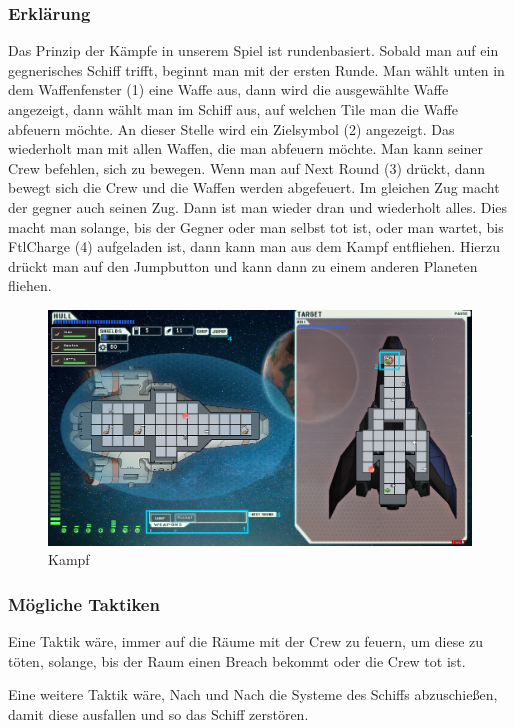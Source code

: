 \documentclass[fontsize=12pt,paper=a4,twoside]{scrartcl}
\begin{document}
\subsubsection{Erklärung}

Das Prinzip der Kämpfe in unserem Spiel ist rundenbasiert. Sobald man auf ein gegnerisches Schiff trifft, beginnt man mit der ersten Runde. Man wählt unten in dem Waffenfenster (1) eine Waffe aus, dann wird die ausgewählte Waffe angezeigt, dann wählt man im Schiff aus, auf welchen Tile man die Waffe abfeuern möchte. An dieser Stelle wird ein Zielsymbol (2) angezeigt. Das wiederholt man mit allen Waffen, die man abfeuern möchte. Man kann seiner Crew befehlen, sich zu bewegen. Wenn man auf Next Round (3) drückt, dann bewegt sich die Crew und die Waffen werden abgefeuert. Im gleichen Zug macht der gegner auch seinen Zug. Dann ist man wieder dran und wiederholt alles. Dies macht man solange, bis der Gegner oder man selbst tot ist, oder man wartet, bis FtlCharge (4) aufgeladen ist, dann kann man aus dem Kampf entfliehen. Hierzu drückt man auf den Jumpbutton und kann dann zu einem anderen Planeten fliehen. 

\begin{figure}[H]
\centering
\includegraphics[width=1\linewidth]{DasSpiel/Kampf/fight.png}
\caption{Kampf}
\end{figure}

\subsubsection{Mögliche Taktiken}

Eine Taktik wäre, immer auf die Räume mit der Crew zu feuern, um diese zu töten, solange, bis der Raum einen Breach bekommt oder die Crew tot ist. 

Eine weitere Taktik wäre, Nach und Nach die Systeme des Schiffs abzuschießen, damit diese ausfallen und so das Schiff zerstören. 
\end{document}

